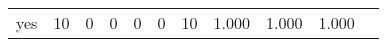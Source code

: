 \begin{longtable}{lp{1.10cm}p{1.10cm}p{1.10cm}p{1.10cm}p{1.10cm}p{1.10cm}p{1.10cm}p{1.10cm}p{1.10cm}p{1.10cm}}
yes       &                     10 &                                  0 &                                 0 &                                0 &                                 0 &                              10 &                          1.000 &                                 1.000 &                               1.000 \\
\end{longtable}
